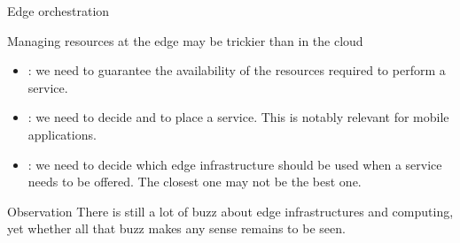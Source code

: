 \begin{slide}{Edge orchestration}
  \begin{block}{Managing resources at the edge may be trickier than in the cloud}
    \begin{itemize}\firmlist

    \item {}: we need to guarantee the availability of the resources required to
      perform a service. 

    \item {}: we need to decide  and  to place a service. This is
      notably relevant for mobile applications.

    \item {}: we need to decide which edge infrastructure should be
      used when a service needs to be offered. The closest one may not be the best one.
    \end{itemize}
  \end{block}

  \begin{alertblock}{Observation}
    There is still a lot of buzz about edge infrastructures and computing, yet whether all that buzz makes any
    sense remains to be seen.
  \end{alertblock}
\end{slide}

